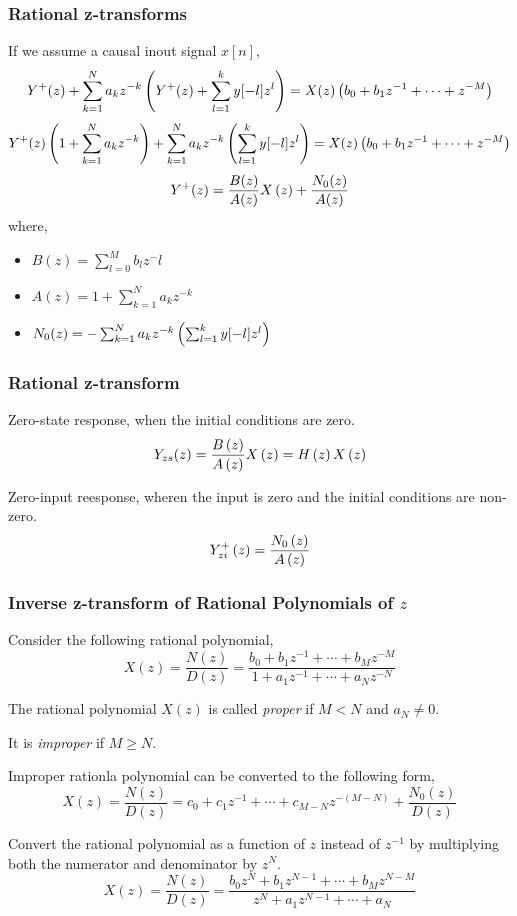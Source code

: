 \documentclass[aspectratio=169]{beamer}
\let\olditem\item
\renewcommand{\item}{\setlength{\itemsep}{\fill}\olditem}
\def\lp{\ensuremath\left(}
\def\rp{\ensuremath\right)}
\begin{document}
\begin{frame}[t]
  \frametitle{Rational z-transforms}
  If we assume a causal inout signal $x[n]$,
  \[ Y^+(z) + \sum_{k=1}^N a_kz^{-k} \lp Y^+(z) + \sum_{l=1}^{k} y[-l] z^{l}\rp = X(z)\lp b_0 + b_1z^{-1} + \cdots + z^{-M} \rp\]
  \[ Y^+(z)\lp 1 + \sum_{k=1}^N a_kz^{-k} \rp + \sum_{k=1}^N a_kz^{-k} \lp \sum_{l=1}^{k} y[-l] z^{l} \rp = X(z)\lp b_0 + b_1z^{-1} + \cdots + z^{-M}\rp \]
  \[ Y^+(z) =  \frac{B(z)}{A(z)} X\lp z \rp + \frac{N_0(z)}{A(z)}  \]
  where, 
  \begin{itemize}
    \item $B(z) = \sum_{l=0}^{M} b_l z^-l$
    \item $A(z) = 1 + \sum_{k=1}^N a_kz^{-k}$
    \item $N_0(z) = -\sum_{k=1}^N a_kz^{-k} \lp \sum_{l=1}^{k} y[-l] z^{l} \rp$
  \end{itemize}
\end{frame}


\begin{frame}[t]
  \frametitle{Rational z-transform}
  Zero-state response, when the initial conditions are zero.
  \[ Y_{zs}(z) = \frac{B\lp z \rp}{A\lp z \rp}X\lp z \rp = H\lp z \rp X\lp z \rp \]

  Zero-input reesponse, wheren the input is zero and the initial conditions are non-zero.
  \[ Y_{zi}^+\lp z \rp = \frac{N_0\lp z \rp}{A\lp z \rp} \]
\end{frame}


\begin{frame}[t]
  \frametitle{Inverse z-transform of Rational Polynomials of $z$}
  Consider the following rational polynomial,
  \[ X(z) = \frac{N(z)}{D(z)} = \frac{b_0 + b_1z^{-1} + \cdots + b_Mz^{-M}}{1 + a_1z^{-1} + \cdots + a_Nz^{-N}} \]

  The rational polynomial $X(z)$ is called \textit{proper} if $M < N$ and $a_N \neq 0$.

  It is \textit{improper} if $M \geq N$.

  Improper rationla polynomial can be converted to the following form,
  \[ X(z) = \frac{N(z)}{D(z)} = c_0 + c_1z^{-1} + \cdots + c_{M-N}z^{-(M-N)} + \frac{N_0(z)}{D(z)} \]

  Convert the rational polynomial as a function of $z$ instead of $z^{-1}$ by multiplying both the numerator and denominator by $z^{N}$.
  \[ X(z) = \frac{N(z)}{D(z)} = \frac{b_0z^N + b_1 z^{N-1} + \cdots + b_Mz^{N-M}}{z^N + a_1z^{N-1} + \cdots + a_N} \]
\end{frame}
\end{document}
